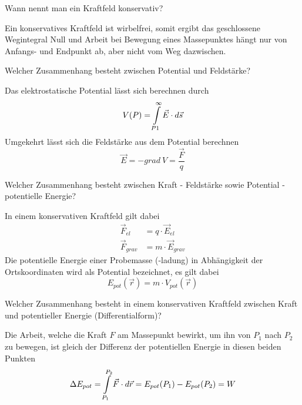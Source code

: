 \documentclass[12pt,a4paper,ngerman]{article}
\begin{document}
\begin{framed}
Wann nennt man ein Kraftfeld konservativ?
\end{framed}

Ein konservatives Kraftfeld ist wirbelfrei, somit ergibt das geschlossene Wegintegral Null und Arbeit bei Bewegung eines Massepunktes hängt nur von Anfangs- und Endpunkt ab, aber nicht vom Weg dazwischen. 

\pagebreak

\begin{framed}
Welcher Zusammenhang besteht zwischen Potential und Feldstärke?
\end{framed}

Das elektrostatische Potential lässt sich berechnen durch 
\begin{equation*}
V(P) = \intop_{P1}^{\infty}{\vec{E}\cdot d\vec{s}}
\end{equation*}
Umgekehrt lässt sich die Feldstärke aus dem Potential berechnen
\begin{equation*}
\vec{E} = - grad \ V = \frac{\Vec{F}}{q}
\end{equation*}



\begin{framed}
Welcher Zusammenhang besteht zwischen Kraft - Feldstärke sowie Potential - potentielle Energie?
\end{framed}

In einem konservativen Kraftfeld gilt dabei
\begin{align*}
\vec{F}_{el} &= q \cdot \vec{E}_{el} \\
\vec{F}_{grav} &= m \cdot \vec{E}_{grav}
\end{align*}
Die potentielle Energie einer Probemasse (-ladung) in Abhängigkeit der Ortskoordinaten wird als Potential bezeichnet, es gilt dabei
\begin{equation*}
E_{pot}(\vec{r}) = m \cdot V_{pot}(\vec{r})
\end{equation*}



\begin{framed}
Welcher Zusammenhang besteht in einem konservativen Kraftfeld zwischen Kraft und potentieller Energie (Differentialform)?
\end{framed}

Die Arbeit, welche die Kraft $F$ am Massepunkt bewirkt, um ihn von $P_1$ nach $P_2$ zu bewegen, ist gleich der Differenz der potentiellen Energie in diesen beiden Punkten
\begin{equation*}
\Delta E_{pot} = \intop_{P_1}^{P_2}{\vec{F} \cdot d\vec{r}} = E_{pot}(P_1) - E_{pot}(P_2) = W
\end{equation*}
\end{document}
